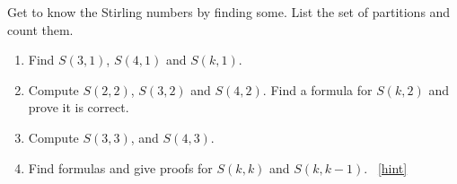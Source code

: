 \documentclass{book}
\begin{document}
\setcounter{project}{198}
\addtocounter{project}{-1}
\begin{activity}[]\label{act_stirlingcomputations}
\hypertarget{p-1129}{}%
Get to know the Stirling numbers by finding some.  List the set of partitions and count them.%
\begin{enumerate}[font=\bfseries,label=(\alph*),ref=\alph*]
\item\label{task-210} \hypertarget{p-1130}{}%
Find \(S(3,1)\), \(S(4,1)\) and \(S(k,1)\).%
\item\label{task-211} \hypertarget{p-1131}{}%
Compute \(S(2,2)\), \(S(3,2)\) and \(S(4,2)\).  Find a formula for \(S(k,2)\) and prove it is correct.%
\item\label{task-212} \hypertarget{p-1132}{}%
Compute \(S(3,3)\), and \(S(4,3)\).%
\item\label{task-213} \hypertarget{p-1133}{}%
Find formulas and give proofs for \(S(k,k)\) and \(S(k,k - 1)\).%
~\hfill{\tiny\hyperlink{a-198.d}{[hint]}\hypertarget{q-198.d}{}}\end{enumerate}
\end{activity}
\end{document}
